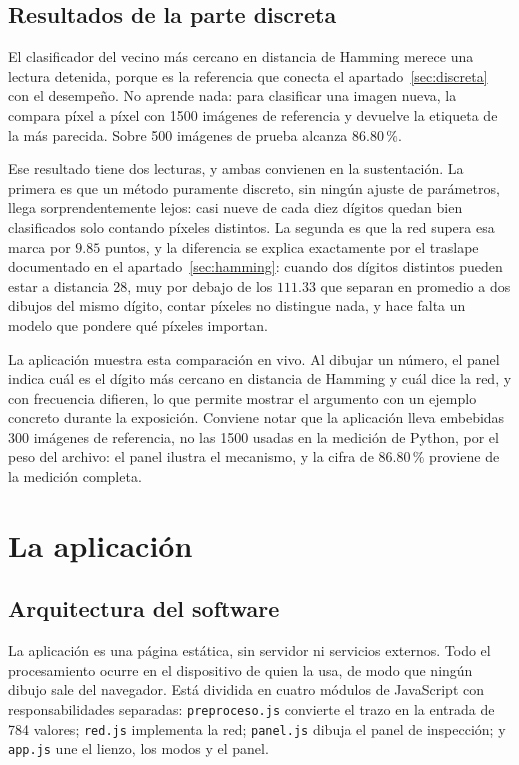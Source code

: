 \documentclass[12pt,letterpaper]{article}
\newcommand{\pc}{\,\%}
\begin{document}
\subsection{Resultados de la parte discreta}
\label{sec:resdiscreta}

El clasificador del vecino más cercano en distancia de Hamming merece una lectura
detenida, porque es la referencia que conecta el apartado~\ref{sec:discreta} con el
desempeño. No aprende nada: para clasificar una imagen nueva, la compara píxel a
píxel con 1500 imágenes de referencia y devuelve la etiqueta de la más parecida.
Sobre 500 imágenes de prueba alcanza $86.80\pc$.

Ese resultado tiene dos lecturas, y ambas convienen en la sustentación. La primera
es que un método puramente discreto, sin ningún ajuste de parámetros, llega
sorprendentemente lejos: casi nueve de cada diez dígitos quedan bien clasificados
solo contando píxeles distintos. La segunda es que la red supera esa marca por
$9.85$ puntos, y la diferencia se explica exactamente por el traslape documentado en
el apartado~\ref{sec:hamming}: cuando dos dígitos distintos pueden estar a distancia
28, muy por debajo de los $111.33$ que separan en promedio a dos dibujos del mismo
dígito, contar píxeles no distingue nada, y hace falta un modelo que pondere qué
píxeles importan.

La aplicación muestra esta comparación en vivo. Al dibujar un número, el panel
indica cuál es el dígito más cercano en distancia de Hamming y cuál dice la red, y
con frecuencia difieren, lo que permite mostrar el argumento con un ejemplo concreto
durante la exposición. Conviene notar que la aplicación lleva embebidas 300 imágenes
de referencia, no las 1500 usadas en la medición de Python, por el peso del archivo:
el panel ilustra el mecanismo, y la cifra de $86.80\pc$ proviene de la medición
completa.

\section{La aplicación}

\subsection{Arquitectura del software}

La aplicación es una página estática, sin servidor ni servicios externos. Todo el
procesamiento ocurre en el dispositivo de quien la usa, de modo que ningún dibujo
sale del navegador. Está dividida en cuatro módulos de JavaScript con
responsabilidades separadas: \texttt{preproceso.js} convierte el trazo en la entrada
de 784 valores; \texttt{red.js} implementa la red; \texttt{panel.js} dibuja el panel
de inspección; y \texttt{app.js} une el lienzo, los modos y el panel.
\end{document}
